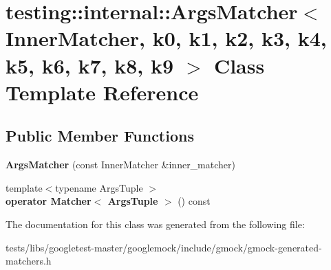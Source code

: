 \hypertarget{classtesting_1_1internal_1_1ArgsMatcher}{}\section{testing\+:\+:internal\+:\+:Args\+Matcher$<$ Inner\+Matcher, k0, k1, k2, k3, k4, k5, k6, k7, k8, k9 $>$ Class Template Reference}
\label{classtesting_1_1internal_1_1ArgsMatcher}
\subsection*{Public Member Functions}
\begin{DoxyCompactItemize}
\item 
\mbox{\label{classtesting_1_1internal_1_1ArgsMatcher_a2879d7455f2da2a5a2f2b6759dbc0561}} 
{\bfseries Args\+Matcher} (const Inner\+Matcher \&inner\+\_\+matcher)
\item 
\mbox{\label{classtesting_1_1internal_1_1ArgsMatcher_ad55698b0de384a9d8875cef5b172cb4a}} 
{\footnotesize template$<$typename Args\+Tuple $>$ }\\{\bfseries operator Matcher$<$ Args\+Tuple $>$} () const
\end{DoxyCompactItemize}


The documentation for this class was generated from the following file\+:\begin{DoxyCompactItemize}
\item 
tests/libs/googletest-\/master/googlemock/include/gmock/gmock-\/generated-\/matchers.\+h\end{DoxyCompactItemize}

